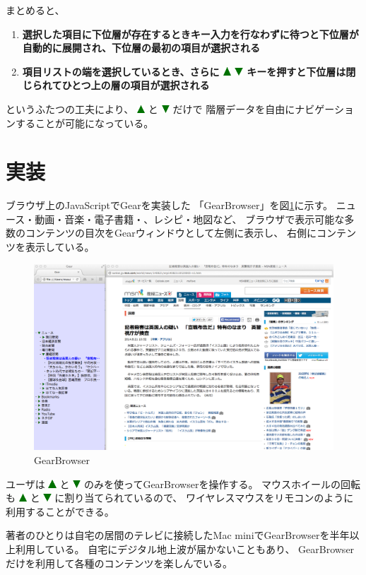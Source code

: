 \documentclass[twoside]{wiss}
\def\GEAR{\textsf{Gear}}
\def\GB{\textsf{GearBrowser}}
\def\up{ \includegraphics[width=3mm,bb=0 0 36 36]{figures/uptriangle.pdf} }
\def\down{ \includegraphics[width=3mm,bb=0 0 36 36]{figures/downtriangle.pdf} }
\begin{document}
まとめると、

\begin{enumerate}
\item \textbf{選択した項目に下位層が存在するときキー入力を行なわずに待つと下位層が自動的に展開され、下位層の最初の項目が選択される}
\item \textbf{項目リストの端を選択しているとき、さらに{\up}{\down}キーを押すと下位層は閉じられてひとつ上の層の項目が選択される}
\end{enumerate}

\noindent
というふたつの工夫により、
{\up}と{\down}だけで
階層データを自由にナビゲーションすることが可能になっている。

\section{実装}

ブラウザ上のJavaScriptで{\GEAR}を実装した
「{\GB}」を図\ref{gearbrowser}に示す。
ニュース・動画・音楽・電子書籍・、レシピ・地図など、
ブラウザで表示可能な多数のコンテンツの目次を{\GEAR}ウィンドウとして左側に表示し、
右側にコンテンツを表示している。

\begin{figure}
\centerline{\includegraphics[width=160mm,bb=0 0 1401 872]{figures/ab4ff7c2d44f4af2bb94fae76589f495.png}}
\caption{\textsf{GearBrowser}}
\label{gearbrowser}
\end{figure}

ユーザは{\up}と{\down}のみを使って{\GB}を操作する。
マウスホイールの回転も{\up}と{\down}に割り当てられているので、
ワイヤレスマウスをリモコンのように利用することができる。

著者のひとりは自宅の居間のテレビに接続したMac miniで{\GB}を半年以上利用している。
自宅にデジタル地上波が届かないこともあり、
{\GB}だけを利用して各種のコンテンツを楽しんでいる。
\end{document}
